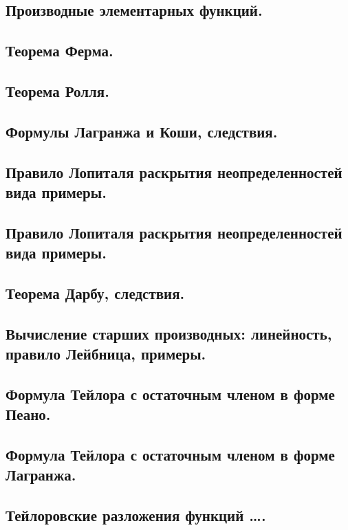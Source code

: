 \documentclass[12pt, a4paper]{article}
\begin{document}
\subsection{Производные элементарных функций.}

\subsection{Теорема Ферма.}

\subsection{Теорема Ролля.}

\subsection{Формулы Лагранжа и Коши, следствия.}

\subsection{Правило Лопиталя раскрытия неопределенностей вида примеры.}

\subsection{Правило Лопиталя раскрытия неопределенностей вида примеры.}

\subsection{Теорема Дарбу, следствия.}

\subsection{Вычисление старших производных: линейность, правило Лейбница, примеры.}

\subsection{Формула Тейлора с остаточным членом в форме Пеано.}

\subsection{Формула Тейлора с остаточным членом в форме Лагранжа.}

\subsection{Тейлоровские разложения функций ….} %
\end{document}
